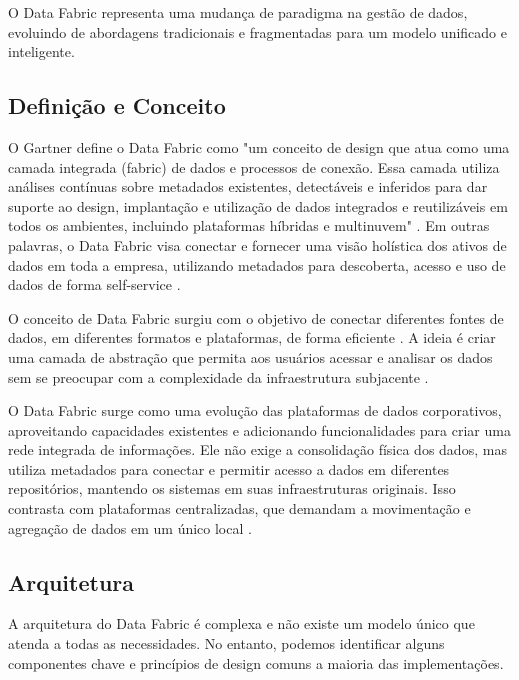 O Data Fabric representa uma mudança de paradigma na gestão de dados, evoluindo de abordagens tradicionais e fragmentadas para um modelo unificado e inteligente.

\subsection{Definição e Conceito}
O Gartner define o Data Fabric como "um conceito de design que atua como uma camada integrada (fabric) de dados e processos de conexão. Essa camada utiliza análises 
contínuas sobre metadados existentes, detectáveis e inferidos para dar suporte ao design, implantação e utilização de dados integrados e reutilizáveis em todos os 
ambientes, incluindo plataformas híbridas e multinuvem" \cite{gartner_data_fabric}. Em outras palavras, o Data Fabric visa conectar 
e fornecer uma visão holística dos ativos de dados em toda a empresa, utilizando metadados para descoberta, acesso e uso de dados de forma self-service \cite{barik2022data}.

O conceito de Data Fabric surgiu com o objetivo de conectar diferentes fontes de dados, em diferentes formatos e plataformas, de forma eficiente \cite{blohm2024data}. A ideia é criar uma 
camada de abstração que permita aos usuários acessar e analisar os dados sem se preocupar com a complexidade da infraestrutura subjacente \cite{barik2022data}.

O Data Fabric surge como uma evolução das plataformas de dados corporativos, aproveitando capacidades existentes e adicionando funcionalidades para criar uma rede 
integrada de informações. Ele não exige a consolidação física dos dados, mas utiliza metadados para conectar e permitir acesso a dados em diferentes repositórios, 
mantendo os sistemas em suas infraestruturas originais. Isso contrasta com plataformas centralizadas, que demandam a movimentação e agregação de dados em um único local \cite{barik2022data}.

\subsection{Arquitetura}
A arquitetura do Data Fabric é complexa e não existe um modelo único que atenda a todas as necessidades. No entanto, podemos identificar alguns componentes chave 
e princípios de design comuns a maioria das implementações.

